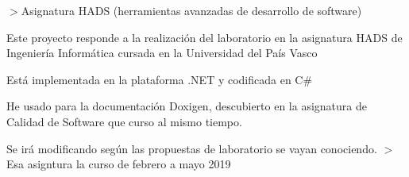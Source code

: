 $>$Asignatura H\+A\+DS (herramientas avanzadas de desarrollo de software)
\begin{DoxyItemize}
\item Este proyecto responde a la realización del laboratorio en la asignatura H\+A\+DS de Ingeniería Informática cursada en la Universidad del País Vasco
\item Está implementada en la plataforma .N\+ET y codificada en C\#
\item He usado para la documentación Doxigen, descubierto en la asignatura de Calidad de Software que curso al mismo tiempo.
\item Se irá modificando según las propuestas de laboratorio se vayan conociendo. $>$Esa asigntura la curso de febrero a mayo 2019 
\end{DoxyItemize}